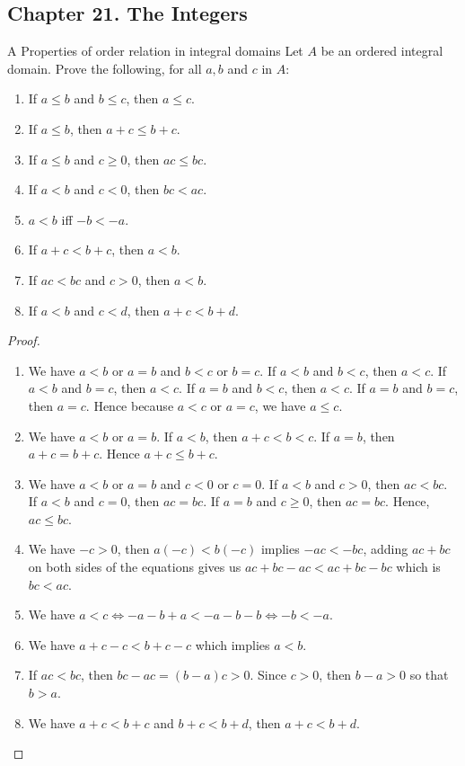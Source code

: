 \subsection*{Chapter 21. The Integers}


\begin{exercise}{A Properties of order relation in integral domains}
Let $A$ be an ordered integral domain. Prove the following, for all $a,b$ and $c$ in $A$:
\begin{enumerate}
    \item If $a\leq b$ and $b\leq c$, then $a\leq c$.
    \item If $a\leq b$, then $a+c\leq b+c$.
    \item If $a\leq b$ and $c\geq 0$, then $ac\leq bc$.
    \item If $a<b$ and $c<0$, then $bc<ac$.
    \item $a<b$ iff $-b<-a$.
    \item If $a+c<b+c$, then $a<b$.
    \item If $ac<bc$ and $c>0$, then $a<b$.
    \item If $a<b$ and $c<d$, then $a+c<b+d$.
\end{enumerate}
\end{exercise}
\begin{proof}
 \begin{enumerate}
    \item We have $a<b$ or $a=b$ and $b<c$ or $b=c$. If $a<b$ and $b<c$, then $a<c$. If $a<b$ and $b=c$, then $a<c$. If $a=b$ and $b<c$, then $a<c$. If $a=b$ and $b=c$, then $a=c$. Hence because $a<c$ or $a=c$, we have $a\leq c$.
    \item We have $a<b$ or $a=b$. If $a<b$, then $a+c<b<c$. If $a=b$, then $a+c=b+c$. Hence $a+c\leq b+c$.
    \item We have $a<b$ or $a=b$ and $c<0$ or $c=0$. If $a<b$ and $c>0$, then $ac<bc$. If $a<b$ and $c=0$, then $ac=bc$. If $a=b$ and $c\geq 0$, then $ac=bc$. Hence, $ac\leq bc$.
    \item We have $-c>0$, then $a(-c)<b(-c)$ implies $-ac<-bc$, adding $ac+bc$ on both sides of the equations gives us $ac+bc-ac<ac+bc-bc$ which is $bc<ac$.
    \item We have $a<c\iff -a-b+a<-a-b-b\iff -b<-a$.
    \item We have $a+c-c<b+c-c$ which implies $a<b$.
    \item If $ac<bc$, then $bc-ac=(b-a)c>0$. Since $c>0$, then $b-a>0$ so that $b>a$.
    \item We have $a+c<b+c$ and $b+c<b+d$, then $a+c<b+d$.
\end{enumerate}
\end{proof}


